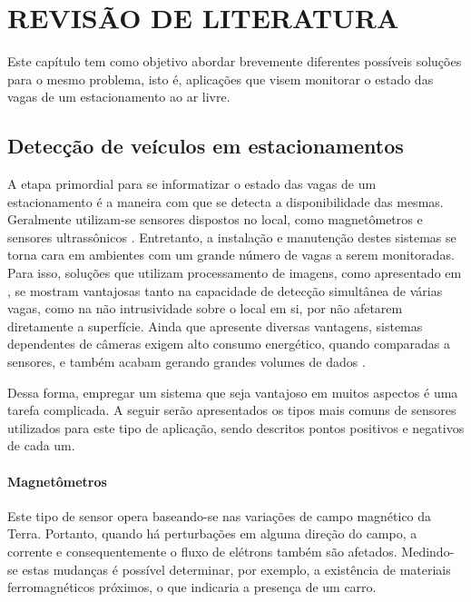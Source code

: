 \documentclass[oneside,openright,12pt]{ufsm_2015} %
\begin{document}
\chapter{REVISÃO DE LITERATURA}
Este capítulo tem como objetivo abordar brevemente diferentes possíveis soluções para o mesmo problema, isto é, aplicações que visem monitorar o estado das vagas de um estacionamento ao ar livre.

\section{Detecção de veículos em estacionamentos}
A etapa primordial para se informatizar o estado das vagas de um estacionamento é a maneira com que se detecta a disponibilidade das mesmas. Geralmente utilizam-se sensores dispostos no local, como magnetômetros \cite{barton2007d} e sensores ultrassônicos \cite{lee2008intelligent}. Entretanto, a instalação e manutenção destes sistemas se torna cara em ambientes com um grande número de vagas a serem monitoradas. Para isso, soluções que utilizam processamento de imagens, como apresentado em \cite{ichihashi2009vacant}, se mostram vantajosas tanto na capacidade de detecção simultânea de várias vagas, como na não intrusividade sobre o local em si, por não afetarem diretamente a superfície. Ainda que apresente diversas vantagens, sistemas dependentes de câmeras exigem alto consumo energético, quando comparadas a sensores, e também acabam gerando grandes volumes de dados \cite{wu2007robust}.

Dessa forma, empregar um sistema que seja vantajoso em muitos aspectos é uma tarefa complicada. A seguir serão apresentados os tipos mais comuns de sensores utilizados para este tipo de aplicação, sendo descritos pontos positivos e negativos de cada um.

\subsubsection{Magnetômetros} 
Este tipo de sensor opera baseando-se nas variações de campo magnético da Terra. Portanto, quando há perturbações em alguma direção do campo, a corrente e consequentemente o fluxo de elétrons também são afetados. Medindo-se estas mudanças é possível determinar, por exemplo, a existência de materiais ferromagnéticos próximos, o que indicaria a presença de um carro. 
\end{document}
